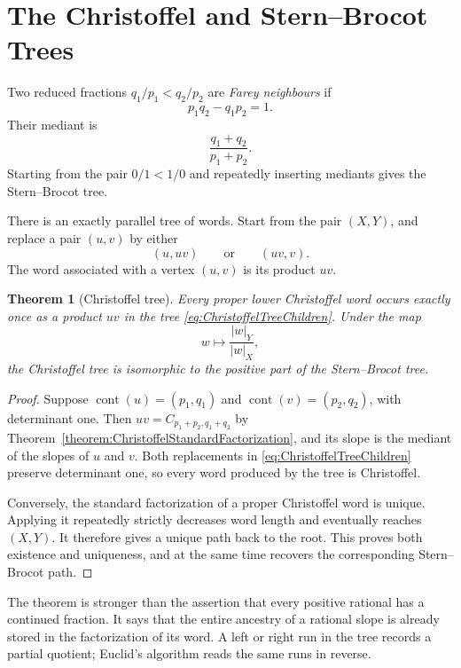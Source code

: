 \documentclass{book}
\newtheorem{theorem}[definition]{Theorem}
\begin{document}
\section{The Christoffel and Stern--Brocot Trees}

Two reduced fractions \(q_1/p_1<q_2/p_2\) are \emph{Farey neighbours} if
\[
  p_1q_2-q_1p_2=1.
\]
Their mediant is
\[
  \frac{q_1+q_2}{p_1+p_2}.
\]
Starting from the pair \(0/1<1/0\) and repeatedly inserting mediants gives
the Stern--Brocot tree.

There is an exactly parallel tree of words.  Start from the pair
\((X,Y)\), and replace a pair \((u,v)\) by either
\begin{equation}\label{eq:ChristoffelTreeChildren}
  (u,uv)\qquad\text{or}\qquad(uv,v).
\end{equation}
The word associated with a vertex \((u,v)\) is its product \(uv\).

\begin{theorem}[Christoffel tree]
  \label{theorem:ChristoffelTree}
  Every proper lower Christoffel word occurs exactly once as a product
  \(uv\) in the tree \eqref{eq:ChristoffelTreeChildren}.  Under the map
  \[
    w\longmapsto\frac{|w|_Y}{|w|_X},
  \]
  the Christoffel tree is isomorphic to the positive part of the
  Stern--Brocot tree.
\end{theorem}
\begin{proof}
  Suppose \(\operatorname{cont}(u)=(p_1,q_1)\) and
  \(\operatorname{cont}(v)=(p_2,q_2)\), with determinant one.  Then
  \(uv=C_{p_1+p_2,q_1+q_2}\) by
  Theorem~\ref{theorem:ChristoffelStandardFactorization}, and its slope is
  the mediant of the slopes of \(u\) and \(v\).  Both replacements in
  \eqref{eq:ChristoffelTreeChildren} preserve determinant one, so every
  word produced by the tree is Christoffel.

  Conversely, the standard factorization of a proper Christoffel word is
  unique.  Applying it repeatedly strictly decreases word length and
  eventually reaches \((X,Y)\).  It therefore gives a unique path back to
  the root.  This proves both existence and uniqueness, and at the same
  time recovers the corresponding Stern--Brocot path.
\end{proof}

The theorem is stronger than the assertion that every positive rational
has a continued fraction.  It says that the entire ancestry of a rational
slope is already stored in the factorization of its word.  A left or right
run in the tree records a partial quotient; Euclid's algorithm reads the
same runs in reverse.
\end{document}
